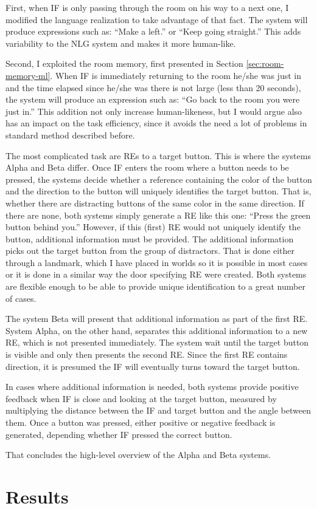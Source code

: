 First, when IF is only passing through the room on his way to a next one, I modified the language realization to take advantage of that fact. The system will produce expressions such as: ``Make a left.'' or ``Keep going straight.'' This adds variability to the NLG system and makes it more human-like.

Second, I exploited the room memory, first presented in Section \ref{sec:room-memory-ml}. When IF is immediately returning to the room he/she was just in and the time elapsed since he/she was there is not large (less than 20 seconds), the system will produce an expression such as: ``Go back to the room you were just in.'' This addition not only increase human-likeness, but I would argue also has an impact on the task efficiency, since it avoids the need a lot of problems in standard method described before.

The most complicated task are REs to a target button. This is where the systems Alpha and Beta differ. Once IF enters the room where a button needs to be pressed, the systems decide whether a reference containing the color of the button and the direction to the button will uniquely identifies the target button. That is, whether there are distracting buttons of the same color in the same direction. If there are none, both systems simply generate a RE like this one: ``Press the green button behind you.'' However, if this (first) RE would not uniquely identify the button, additional information must be provided. The additional information picks out the target button from the group of distractors. That is done either through a landmark, which I have placed in worlds so it is possible in most cases or it is done in a similar way the door specifying RE were created. Both systems are flexible enough to be able to provide unique identification to a great number of cases.

The system Beta will present that additional information as part of the first RE. System Alpha, on the other hand, separates this additional information to a new RE, which is not presented immediately. The system wait until the target button is visible and only then presents the second RE. Since the first RE contains direction, it is presumed the IF will eventually turns toward the target button.

In cases where additional information is needed, both systems provide positive feedback when IF is close and looking at the target button, measured by multiplying the distance between the IF and target button and the angle between them. Once a button was pressed, either positive or negative feedback is generated, depending whether IF pressed the correct button.

That concludes the high-level overview of the Alpha and Beta systems.

\section{Results}